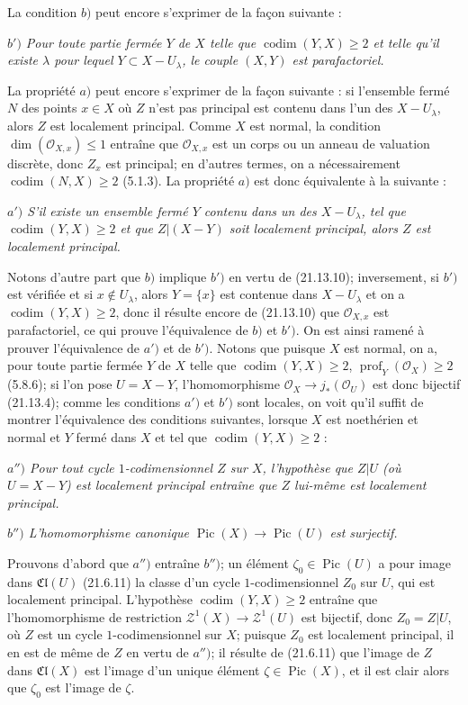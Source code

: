 La condition $b)$ peut encore s'exprimer de la façon suivante :

\emph{$b')$ Pour toute partie fermée $Y$ de $X$ telle que
$\operatorname{codim}(Y,X)\geq2$ et telle qu'il existe $\lambda$ pour lequel
$Y\subset X-U_\lambda$, le couple $(X,Y)$ est parafactoriel.}

La propriété $a)$ peut encore s'exprimer de la façon suivante : si l'ensemble fermé
$N$ des points $x\in X$ où $Z$ n'est pas principal est contenu dans l'un des
$X-U_\lambda$, alors $Z$ est localement principal. Comme $X$ est normal, la condition
$\dim(\mathcal O_{X,x})\leq1$ entraîne que $\mathcal O_{X,x}$ est un corps ou un
anneau de valuation discrète, donc $Z_x$ est principal; en d'autres termes, on a
nécessairement $\operatorname{codim}(N,X)\geq2$ (5.1.3). La propriété $a)$ est donc
équivalente à la suivante :

\emph{$a')$ S'il existe un ensemble fermé $Y$ contenu dans un des $X-U_\lambda$, tel
que $\operatorname{codim}(Y,X)\geq2$ et que $Z|(X-Y)$ soit localement principal,
alors $Z$ est localement principal.}

Notons d'autre part que $b)$ implique $b')$ en vertu de (21.13.10); inversement, si
$b')$ est vérifiée et si $x\notin U_\lambda$, alors $Y=\{x\}$ est contenue dans
$X-U_\lambda$ et on a $\operatorname{codim}(Y,X)\geq2$, donc il résulte encore de
(21.13.10) que $\mathcal O_{X,x}$ est parafactoriel, ce qui prouve l'équivalence de
$b)$ et $b')$. On est ainsi ramené à prouver l'équivalence de $a')$ et de $b')$.
Notons que puisque $X$ est normal, on a, pour toute partie fermée $Y$ de $X$ telle que
$\operatorname{codim}(Y,X)\geq2$, $\operatorname{prof}_Y(\mathcal O_X)\geq2$
(5.8.6); si l'on pose $U=X-Y$, l'homomorphisme
$\mathcal O_X\to j_*(\mathcal O_U)$ est donc bijectif (21.13.4); comme les conditions
$a')$ et $b')$ sont locales, on voit qu'il suffit de montrer l'équivalence des
conditions suivantes, lorsque $X$ est noethérien et normal et $Y$ fermé dans $X$ et
tel que $\operatorname{codim}(Y,X)\geq2$ :

\emph{$a'')$ Pour tout cycle $1$-codimensionnel $Z$ sur $X$, l'hypothèse que $Z|U$
(où $U=X-Y$) est localement principal entraîne que $Z$ lui-même est localement
principal.}

\emph{$b'')$ L'homomorphisme canonique
$\operatorname{Pic}(X)\to\operatorname{Pic}(U)$ est surjectif.}

Prouvons d'abord que $a'')$ entraîne $b'')$; un élément
$\zeta_0\in\operatorname{Pic}(U)$ a pour image dans $\mathfrak{Cl}(U)$ (21.6.11) la
classe d'un cycle $1$-codimensionnel $Z_0$ sur $U$, qui est localement principal.
L'hypothèse $\operatorname{codim}(Y,X)\geq2$ entraîne que l'homomorphisme de
restriction $\mathscr Z^1(X)\to\mathscr Z^1(U)$ est bijectif, donc $Z_0=Z|U$, où $Z$
est un cycle $1$-codimensionnel sur $X$; puisque $Z_0$ est localement principal, il en
est de même de $Z$ en vertu de $a'')$; il résulte de (21.6.11) que l'image de $Z$ dans
$\mathfrak{Cl}(X)$ est l'image d'un unique élément $\zeta\in\operatorname{Pic}(X)$,
et il est clair alors que $\zeta_0$ est l'image de $\zeta$.

